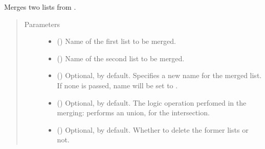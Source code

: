 \documentclass[letterpaper,10pt,english]{sphinxmanual}
\begin{document}
\begin{fulllineitems}
\begin{fulllineitems}
\begin{quote}
\begin{description}
\end{description}\end{quote}

\end{fulllineitems}


\begin{fulllineitems}
\label{\detokenize{reference:pypath.main.PyPath.merge_lists}}
Merges two lists from .
\begin{quote}\begin{description}
\item[{Parameters}] \leavevmode\begin{itemize}
\item {} 
 () \textendash{} Name of the first list to be merged.

\item {} 
 () \textendash{} Name of the second list to be merged.

\item {} 
 () \textendash{} Optional,  by default. Specifies a new name for the
merged list. If none is passed, name will be set to
.

\item {} 
 () \textendash{} Optional,  by default. The logic operation perfomed
in the merging:  performs an union,  for
the intersection.

\item {} 
 () \textendash{} Optional,  by default. Whether to delete the
former lists or not.


\end{itemize}
\end{description}
\end{quote}
\end{fulllineitems}
\end{fulllineitems}
\end{document}
